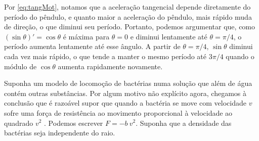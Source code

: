 \documentclass[]{IMTexam}
\begin{document}
\begin{questions}
\begin{solution}
\begin{unindent}
			\item Por \ref{eq:tangMot}, notamos que a aceleração tangencial depende diretamente do período do pêndulo, e quanto maior a aceleração do pêndulo, mais rápido muda de direção, o que diminui seu período. Portanto, podemos argumentar que, como $ (\sin\theta)'=\cos\theta $ é máxima para $ \theta=0 $ e diminui lentamente até $ \theta=\pi/4 $, o período aumenta lentamente até esse ângulo. A partir de $ \theta=\pi/4 $, $ \sin\theta $ diminui cada vez mais rápido, o que tende a manter o mesmo período até $ 3\pi/4 $ quando o módulo de $ \cos\theta $ aumenta rapidamente novamente.
		\end{unindent}
	\end{solution}


	\question Suponha um modelo de locomoção de bactérias numa solução que além de água contém outras substâncias. Por algum motivo não explícito agora, chegamos à conclusão que é razoável supor que quando a bactéria se move com velocidade $ v $ sofre uma força de resistência ao movimento proporcional à velocidade ao quadrado $ v^{2} $ . Podemos escrever $ F=−b\ v^{2} $. Suponha que a densidade das bactérias seja independente do raio.

\end{questions}
\end{document}
